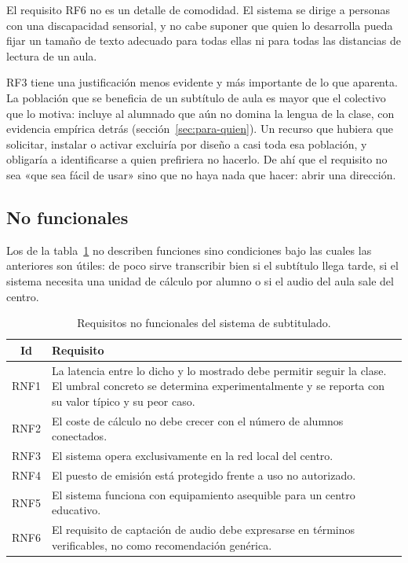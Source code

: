 El requisito RF6 no es un detalle de comodidad. El sistema se dirige a personas con una
discapacidad sensorial, y no cabe suponer que quien lo desarrolla pueda fijar un tamaño de
texto adecuado para todas ellas ni para todas las distancias de lectura de un aula.

RF3 tiene una justificación menos evidente y más importante de lo que aparenta. La
población que se beneficia de un subtítulo de aula es mayor que el colectivo que lo motiva:
incluye al alumnado que aún no domina la lengua de la clase, con evidencia empírica detrás
(sección~\ref{sec:para-quien}). Un recurso que hubiera que solicitar, instalar o activar
excluiría por diseño a casi toda esa población, y obligaría a identificarse a quien
prefiriera no hacerlo. De ahí que el requisito no sea «que sea fácil de usar» sino que no
haya nada que hacer: abrir una dirección.

\subsection{No funcionales}

Los de la tabla~\ref{tab:rnf} no describen funciones sino condiciones bajo las cuales las
anteriores son útiles: de poco sirve transcribir bien si el subtítulo llega tarde, si el
sistema necesita una unidad de cálculo por alumno o si el audio del aula sale del centro.

\begin{table}[h]
\centering
\small
\begin{tabular}{|c|p{11cm}|}
\hline
\textbf{Id} & \textbf{Requisito} \\
\hline
RNF1 & La latencia entre lo dicho y lo mostrado debe permitir seguir la clase. El umbral
       concreto se determina experimentalmente y se reporta con su valor típico y su peor
       caso. \\
\hline
RNF2 & El coste de cálculo no debe crecer con el número de alumnos conectados. \\
\hline
RNF3 & El sistema opera exclusivamente en la red local del centro. \\
\hline
RNF4 & El puesto de emisión está protegido frente a uso no autorizado. \\
\hline
RNF5 & El sistema funciona con equipamiento asequible para un centro educativo. \\
\hline
RNF6 & El requisito de captación de audio debe expresarse en términos verificables, no
       como recomendación genérica. \\
\hline
\end{tabular}
\caption{Requisitos no funcionales del sistema de subtitulado.}
\label{tab:rnf}
\end{table}

